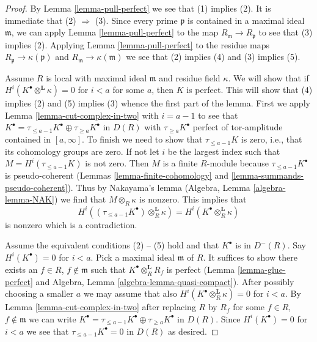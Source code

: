 \begin{proof}
By Lemma \ref{lemma-pull-perfect} we see that (1) implies (2).
It is immediate that (2) $\Rightarrow$ (3). Since every prime
$\mathfrak p$ is contained in a maximal ideal $\mathfrak m$,
we can apply Lemma \ref{lemma-pull-perfect} to the map
$R_\mathfrak m \to R_\mathfrak p$ to see that (3) implies (2).
Applying Lemma \ref{lemma-pull-perfect} to the residue maps
$R_\mathfrak p \to \kappa(\mathfrak p)$ and
$R_\mathfrak m \to \kappa(\mathfrak m)$ we see that (2) implies
(4) and (3) implies (5).

\medskip\noindent
Assume $R$ is local with maximal ideal $\mathfrak m$ and
residue field $\kappa$. We will show that if
$H^i(K^\bullet \otimes^\mathbf{L} \kappa) = 0$ for $i < a$
for some $a$, then $K$ is perfect. This will show that
(4) implies (2) and (5) implies (3) whence the first part
of the lemma. First we apply Lemma \ref{lemma-cut-complex-in-two}
with $i = a - 1$ to see that
$K^\bullet = \tau_{\leq a - 1}K^\bullet \oplus \tau_{\geq a}K^\bullet$
in $D(R)$ with $\tau_{\geq a}K^\bullet$ perfect of tor-amplitude
contained in $[a, \infty]$. To finish we need to show that
$\tau_{\leq a - 1}K$ is zero, i.e., that its cohomology groups are zero.
If not let $i$ be the largest index such that $M = H^i(\tau_{\leq a - 1}K)$
is not zero. Then $M$ is a finite $R$-module because
$\tau_{\leq a - 1}K^\bullet$ is pseudo-coherent
(Lemmas \ref{lemma-finite-cohomology} and \ref{lemma-summands-pseudo-coherent}).
Thus by Nakayama's lemma (Algebra, Lemma \ref{algebra-lemma-NAK})
we find that $M \otimes_R \kappa$ is nonzero.
This implies that
$$
H^i((\tau_{\leq a - 1}K^\bullet) \otimes_R^\mathbf{L} \kappa) =
H^i(K^\bullet \otimes_R^\mathbf{L} \kappa)
$$
is nonzero which is a contradiction.

\medskip\noindent
Assume the equivalent conditions (2) -- (5) hold and that
$K^\bullet$ is in $D^{-}(R)$. Say $H^i(K^\bullet) = 0$ for
$i < a$. Pick a maximal ideal $\mathfrak m$ of $R$.
It suffices to show there exists an $f \in R$, $f \not \in \mathfrak m$
such that $K^\bullet \otimes_R^\mathbf{L} R_f$ is perfect
(Lemma \ref{lemma-glue-perfect} and
Algebra, Lemma \ref{algebra-lemma-quasi-compact}).
After possibly choosing a smaller $a$ we may assume that
also $H^i(K^\bullet \otimes^\mathbf{L}_R \kappa) = 0$
for $i < a$. By Lemma \ref{lemma-cut-complex-in-two}
after replacing $R$ by $R_f$
for some $f \in R$, $f \not \in \mathfrak m$
we can write $K^\bullet = \tau_{\leq a - 1}K^\bullet \oplus
\tau_{\geq a}K^\bullet$ in $D(R)$.
Since $H^i(K^\bullet) = 0$ for $i < a$ we see that
$\tau_{\leq a - 1}K^\bullet = 0$ in $D(R)$ as desired.
\end{proof}

